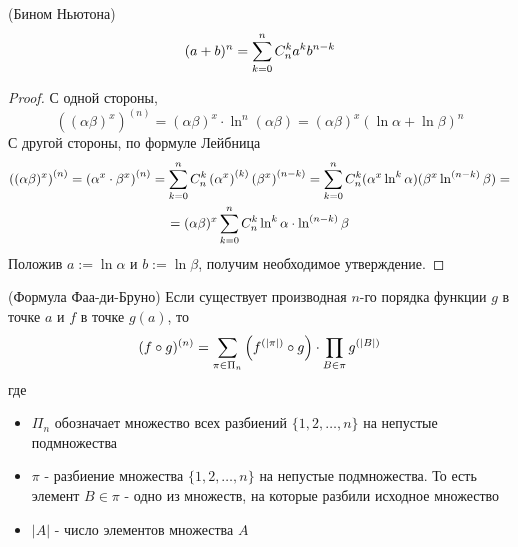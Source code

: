 \begin{corollary} (Бином Ньютона)
	\[
		(a + b)^n = \sum\limits_{k = 0}^n C_n^k a^k b^{n - k}
	\]
\end{corollary}

\begin{proof}
	С одной стороны,
	\[
		\left((\alpha\beta)^x\right)^{(n)} = (\alpha\beta)^x \cdot \ln^n (\alpha\beta) = (\alpha\beta)^x(\ln \alpha + \ln \beta)^n
	\]
	С другой стороны, по формуле Лейбница
	\begin{multline*}
		\left((\alpha\beta)^x\right)^{(n)} =
		\left(\alpha^x \cdot \beta^x\right)^{(n)} =
		\sum\limits_{k = 0}^n C_n^k \left(\alpha^x\right)^{(k)}
		\left(\beta^x\right)^{(n - k)} =
		\sum\limits_{k = 0}^n C_n^k (\alpha^x \ln^k \alpha)
		(\beta^x \ln^{(n - k)} \beta) = \\
		= (\alpha\beta)^x \sum\limits_{k = 0}^n C_n^k \ln^k
		\alpha \cdot \ln^{(n - k)} \beta
	\end{multline*}
	Положив $a := \ln \alpha$ и $b := \ln \beta$, получим необходимое утверждение.
\end{proof}

\begin{theorem} (Формула Фаа-ди-Бруно)
	Если существует производная $n$-го порядка функции $g$ в точке $a$ и $f$ в точке $g(a)$, то
	\[
		(f \circ g)^{(n)} = \sum\limits_{\pi \in \Pi_n} \left(f^{(|\pi|)} \circ g\right) \cdot \prod\limits_{B \in \pi} g^{(|B|)}
	\]
	где 
	\begin{itemize}
		\item $\Pi_n$ обозначает множество всех разбиений $\{1, 2, \dots, n\}$ на непустые подмножества
		
		\item $\pi$ - разбиение множества $\{1, 2, \ldots, n\}$ на непустые подмножества. То есть элемент $B \in \pi$ - одно из множеств, на которые разбили исходное множество
		
		\item $|A|$ - число элементов множества $A$
	\end{itemize}
\end{theorem}

